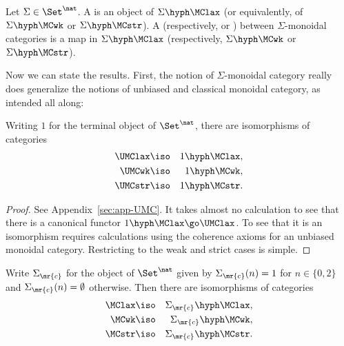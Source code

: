 \begin{defn}	
Let $\Sigma\in\Set^\nat$.  A %
%
%
%
%
is an
object of $\Sigma\hyph\MClax$ (or equivalently, of $\Sigma\hyph\MCwk$ or
$\Sigma\hyph\MCstr$).  A  (respectively,  or
) %
%
%
between $\Sigma$-monoidal
categories is a map in $\Sigma\hyph\MClax$ (respectively,
$\Sigma\hyph\MCwk$ or $\Sigma\hyph\MCstr$).
\end{defn}

Now we can state the results.  First, the notion of $\Sigma$-monoidal
category really does generalize the notions of unbiased and classical
monoidal category, as intended all along:

\begin{thm}%
%
%
Writing $1$ for the terminal object of $\Set^\nat$, there are
isomorphisms of categories
%
\begin{eqnarray*}
\UMClax		&\iso 	&1\hyph\MClax,	\\
\UMCwk		&\iso  	&1\hyph\MCwk , 	\\
\UMCstr		&\iso	&1\hyph\MCstr.   
\end{eqnarray*}
%
\end{thm}

\begin{proof}  
See Appendix~\ref{sec:app-UMC}.  It takes almost no calculation to see that
there is a canonical functor $1\hyph\MClax \go \UMClax$.  To see that it
is an isomorphism requires calculations using the coherence axioms for an
unbiased monoidal category.  Restricting to the weak and strict cases is
simple.  \done
\end{proof}

\begin{thm}
Write $\Sigma_\mr{c}$%
% 
% 
for the object of $\Set^\nat$ given by
$\Sigma_\mr{c}(n)=1$ for $n\in\{0,2\}$ and $\Sigma_\mr{c}(n)=\emptyset$
otherwise.  Then there are isomorphisms of categories
%
\begin{eqnarray*}
\MClax		&\iso 	&\Sigma_\mr{c}\hyph\MClax,	\\
\MCwk		&\iso  	&\Sigma_\mr{c}\hyph\MCwk , 	\\
\MCstr		&\iso	&\Sigma_\mr{c}\hyph\MCstr.   
\end{eqnarray*}
%
\end{thm}

